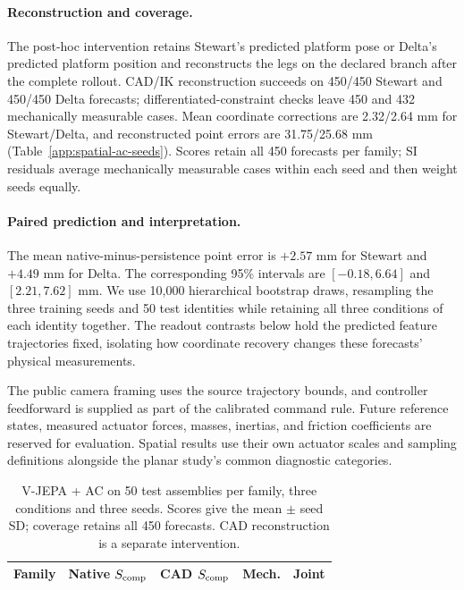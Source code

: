 \documentclass[10pt,twocolumn,letterpaper]{article}
\begin{document}
\paragraph{Reconstruction and coverage.}
The post-hoc intervention retains Stewart's predicted platform pose or Delta's predicted platform position and reconstructs the legs on the declared branch after the complete rollout. CAD/IK reconstruction succeeds on 450/450 Stewart and 450/450 Delta forecasts; differentiated-constraint checks leave 450 and 432 mechanically measurable cases. Mean coordinate corrections are 2.32/2.64 mm for Stewart/Delta, and reconstructed point errors are 31.75/25.68 mm (Table~\ref{app:spatial-ac-seeds}). Scores retain all 450 forecasts per family; SI residuals average mechanically measurable cases within each seed and then weight seeds equally.

\paragraph{Paired prediction and interpretation.}
The mean native-minus-persistence point error is $+2.57$ mm for Stewart and $+4.49$ mm for Delta. The corresponding 95\% intervals are $[-0.18,6.64]$ and $[2.21,7.62]$ mm. We use 10,000 hierarchical bootstrap draws, resampling the three training seeds and 50 test identities while retaining all three conditions of each identity together. The readout contrasts below hold the predicted feature trajectories fixed, isolating how coordinate recovery changes these forecasts' physical measurements.

The public camera framing uses the source trajectory bounds, and controller feedforward is supplied as part of the calibrated command rule. Future reference states, measured actuator forces, masses, inertias, and friction coefficients are reserved for evaluation. Spatial results use their own actuator scales and sampling definitions alongside the planar study's common diagnostic categories.

\begin{table}[t]
\caption{V-JEPA + AC on 50 test assemblies per family, three conditions and three seeds. Scores give the mean $\pm$ seed SD; coverage retains all 450 forecasts. CAD reconstruction is a separate intervention.}
\label{app:spatial-ac-scores}
\centering\small
\begin{tabular}{lrrrr}
\toprule
Family & Native $S_{\rm comp}$ & CAD $S_{\rm comp}$ & Mech. & Joint\\
\midrule

\bottomrule
\end{tabular}
\end{table}
\end{document}
